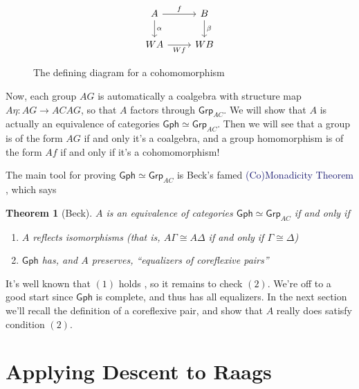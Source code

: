 \documentclass[12pt]{article}
\newtheorem{thm}{Theorem}
\theoremstyle{definition}
\theoremstyle{theorem}
\newcommand*{\catFont}[1]{\mathsf{#1}}
\newcommand{\Grp}{\catFont{Grp}}
\newcommand*{\important}[1]{\textcolor{MidnightBlue}{#1}}
\begin{document}
\begin{figure}
    \caption{The defining diagram for a cohomomorphism}
    \label{cohom}
    \[
        \begin{tikzcd}
        A & B \\
        WA & WB
        \arrow["\alpha", from=1-1, to=2-1]
        \arrow["\beta", from=1-2, to=2-2]
        \arrow["f", from=1-1, to=1-2]
        \arrow["Wf"', from=2-1, to=2-2]
        \end{tikzcd}
    \]    
\end{figure}

Now, each group $AG$ is automatically a coalgebra with structure map
$A \eta : AG \to ACAG$, so that $A$ factors through $\Grp_{AC}$.
We will show that $A$ is actually an equivalence of categories 
$\mathsf{Gph} \simeq \Grp_{AC}$. Then we will see that a group is of the
form $AG$ if and only it's a coalgebra, and a group homomorphism is of the
form $Af$ if and only if it's a cohomomorphism!

The main tool for proving $\mathsf{Gph} \simeq \Grp_{AC}$ is Beck's famed
\important{(Co)Monadicity Theorem} , which says

\begin{thm}[Beck]
    $A$ is an equivalence of categories $\mathsf{Gph} \simeq \Grp_{AC}$ 
    if and only if

    \begin{enumerate}
        \item $A$ reflects isomorphisms (that is, $A\Gamma \cong A\Delta$ if and only if $\Gamma \cong \Delta$)
        \item $\mathsf{Gph}$ has, and $A$ preserves, ``equalizers of coreflexive pairs''
    \end{enumerate}
\end{thm}

It's well known that $(1)$ holds 
, so it remains to check $(2)$. We're off to a good start since $\mathsf{Gph}$
is complete, and thus has all equalizers. In the next section we'll recall
the definition of a coreflexive pair, and show that $A$ really does satisfy
condition $(2)$.

\section{Applying Descent to Raags}
\label{proof}
\end{document}
